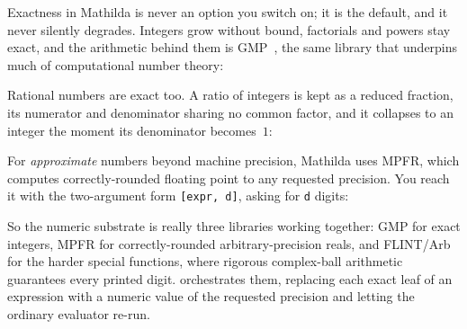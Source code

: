 Exactness in Mathilda is never an option you switch on; it is the default, and it never
silently degrades. Integers grow without bound, factorials and powers stay exact, and
the arithmetic behind them is GMP~\cite{gmp}, the same library that underpins much of
computational number theory:

\begin{codepairs}
\end{codepairs}

Rational numbers are exact too. A ratio of integers is kept as a reduced fraction, its
numerator and denominator sharing no common factor, and it collapses to an integer the
moment its denominator becomes~$1$:

\begin{codepairs}
\end{codepairs}

For \emph{approximate} numbers beyond machine precision, Mathilda uses MPFR, which
computes correctly-rounded floating point to any requested precision. You reach it with
the two-argument form \texttt{[expr, d]}, asking for \texttt{d} digits:

\begin{codepairs}
\end{codepairs}

So the numeric substrate is really three libraries working together: GMP for exact
integers, MPFR for correctly-rounded arbitrary-precision reals, and FLINT/Arb for the
harder special functions, where rigorous complex-ball arithmetic guarantees every
printed digit.  orchestrates them, replacing each exact leaf of an expression with
a numeric value of the requested precision and letting the ordinary evaluator re-run.

